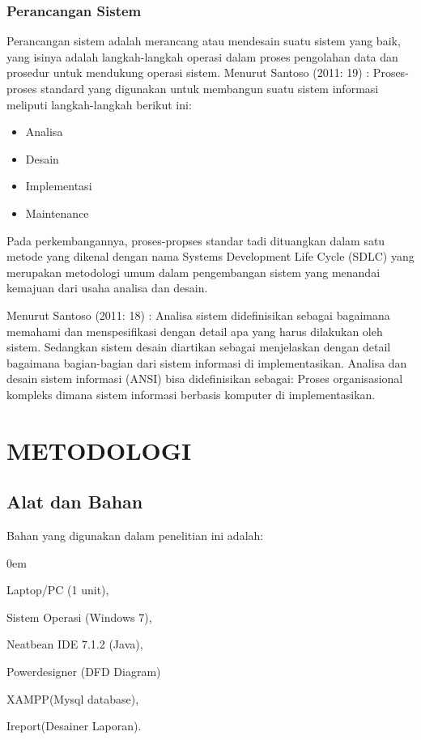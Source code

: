 \documentclass{jtetiproposalskripsi}
\begin{document}
\subsection{Perancangan Sistem}
Perancangan sistem adalah merancang atau mendesain suatu sistem yang baik, yang isinya adalah langkah-langkah operasi dalam proses pengolahan data dan prosedur untuk mendukung operasi sistem. 
Menurut Santoso (2011: 19) : Proses-proses standard yang digunakan untuk membangun suatu sistem informasi meliputi langkah-langkah berikut ini: 
\begin{itemize}
\item Analisa 
\item Desain 
\item Implementasi 
\item Maintenance 
\end{itemize}
Pada perkembangannya, proses-propses standar tadi dituangkan dalam satu metode yang dikenal dengan nama Systems Development Life Cycle (SDLC) yang merupakan metodologi umum dalam pengembangan sistem  yang menandai kemajuan dari usaha analisa dan desain.

Menurut Santoso (2011: 18) : Analisa sistem didefinisikan sebagai bagaimana memahami dan menspesifikasi dengan detail apa yang harus dilakukan oleh sistem. Sedangkan sistem desain diartikan sebagai menjelaskan dengan detail bagaimana bagian-bagian dari sistem informasi di implementasikan. Analisa dan desain sistem informasi (ANSI) bisa didefinisikan sebagai: Proses organisasional kompleks dimana sistem informasi berbasis komputer di implementasikan.

\chapter{METODOLOGI}

\section{Alat dan Bahan}
Bahan yang digunakan dalam penelitian ini adalah:

\vspace{-0.5cm}

\begin{enumerate}[a.]
\begin{singlespace}
\itemsep0em
\item Laptop/PC (1 unit),
\item Sistem Operasi (Windows 7),
\item Neatbean IDE 7.1.2 (Java),
\item Powerdesigner (DFD Diagram)
\item XAMPP(Mysql database),
\item Ireport(Desainer Laporan).
\end{singlespace}
\end{enumerate}
\end{document}
